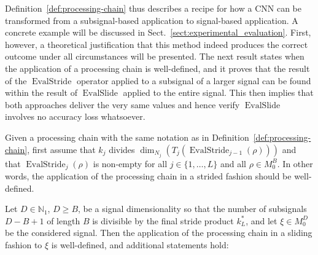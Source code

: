 \documentclass[journal]{IEEEtran}
\newcommand{\N}{\mathbb{N}}
\newcommand{\ROI}{B}
\newcommand{\discint}[2]{\{#1,\dotsc,#2\}}
\newcommand{\inint}[2]{\in\discint{#1}{#2}}
\DeclareMathOperator{\EvalStride}{EvalStride}
\DeclareMathOperator{\EvalSlide}{EvalSlide}
\begin{document}
Definition~\ref{def:processing-chain} thus describes a recipe for how a CNN can be transformed from a subsignal-based application to signal-based application.
A concrete example will be discussed in Sect.~\ref{sect:experimental_evaluation}.
First, however, a theoretical justification that this method indeed produces the correct outcome under all circumstances will be presented.
The next result states when the application of a processing chain is well-defined, and it proves that the result of the $\EvalStride$ operator applied to a subsignal of a larger signal can be found within the result of $\EvalSlide$ applied to the entire signal.
This then implies that both approaches deliver the very same values and hence verify $\EvalSlide$ involves no accuracy loss whatsoever.
\begin{lemma}
\label{lem:processing-chain}
Given a processing chain with the same notation as in Definition~\ref{def:processing-chain},
first assume that $k_j$ divides $\dim_{N_j}(T_j(\EvalStride_{j - 1}(\rho)))$ and that $\EvalStride_{j}(\rho)$ is non-empty for all $j\inint{1}{L}$ and all $\rho\in M_0^\ROI$.
In other words, the application of the processing chain in a strided fashion should be well-defined.

Let $D\in\N_1$, $D\geq\ROI$, be a signal dimensionality so that the number of subsignals $D - \ROI + 1$ of length $\ROI$ is divisible by the final stride product $k_L^*$, and let $\xi\in M_0^D$ be the considered signal.
Then the application of the processing chain in a sliding fashion to $\xi$ is well-defined, and additional statements hold:


\end{lemma}
\end{document}

